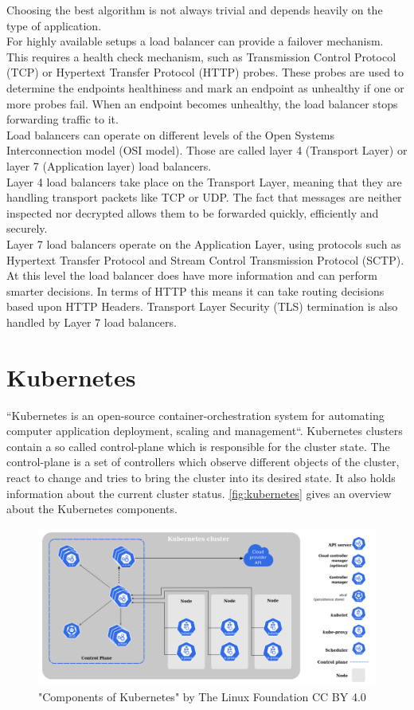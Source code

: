 Choosing the best algorithm is not always trivial and depends heavily on the type of application.~\cite{ALLEN-LOAD-BALANCING}
\\
For highly available setups a load balancer can provide a failover mechanism.
This requires a health check mechanism, such as Transmission Control Protocol (TCP) or Hypertext Transfer Protocol (HTTP) probes.
These probes are used to determine the endpoints healthiness and mark an endpoint as unhealthy if one or more probes fail.
When an endpoint becomes unhealthy, the load balancer stops forwarding traffic to it.
\\
Load balancers can operate on different levels of the Open Systems Interconnection model (OSI model).
Those are called layer 4 (Transport Layer) or layer 7 (Application layer) load balancers.
\\
Layer 4 load balancers take place on the Transport Layer, meaning that they are handling transport packets like TCP or UDP.
The fact that messages are neither inspected nor decrypted allows them to be forwarded quickly, efficiently and securely.
\\
Layer 7 load balancers operate on the Application Layer, using protocols such as Hypertext Transfer Protocol and Stream Control Transmission Protocol (SCTP).
At this level the load balancer does have more information and can perform smarter decisions.
In terms of HTTP this means it can take routing decisions based upon HTTP Headers.
Transport Layer Security (TLS) termination is also handled by Layer 7 load balancers.~\cite{NICHOLSON-LOAD-BALANCING}

\section{Kubernetes}
``Kubernetes is an open-source container-orchestration system for automating computer application deployment, scaling and management``\cite{Kubernetes}.
Kubernetes clusters contain a so called control-plane which is responsible for the cluster state.
The control-plane is a set of controllers which observe different objects of the cluster, react to change and tries to bring the cluster into its desired state.
It also holds information about the current cluster status.
\autoref{fig:kubernetes} gives an overview about the Kubernetes components.

\begin{figure}[H]
    \centering
    \includegraphics[width=1\linewidth]{media/02/kubernetes}
    \caption{"Components of Kubernetes" by The Linux Foundation CC BY 4.0}
    \label{fig:kubernetes}
\end{figure}

